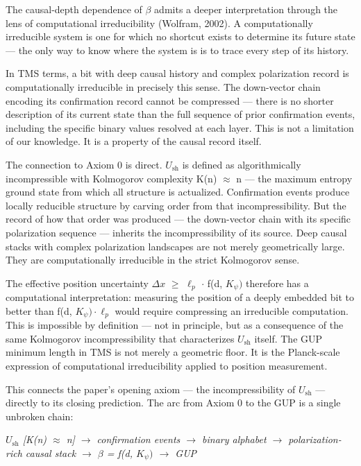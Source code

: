 \documentclass[11pt,oneside]{report}
\theoremstyle{definition}
\theoremstyle{remark}
\begin{document}
The causal-depth dependence of \ensuremath{\beta} admits a deeper interpretation through
the lens of computational irreducibility (Wolfram, 2002). A
computationally irreducible system is one for which no shortcut exists
to determine its future state --- the only way to know where the system
is is to trace every step of its history.

In TMS terms, a bit with deep causal history and complex polarization
record is computationally irreducible in precisely this sense. The
down-vector chain encoding its confirmation record cannot be compressed
--- there is no shorter description of its current state than the full
sequence of prior confirmation events, including the specific binary
values resolved at each layer. This is not a limitation of our
knowledge. It is a property of the causal record itself.

The connection to Axiom 0 is direct. \ensuremath{U_{\mathrm{sh}}} is defined as algorithmically
incompressible with Kolmogorov complexity K(n) \ensuremath{\approx} n --- the maximum
entropy ground state from which all structure is actualized.
Confirmation events produce locally reducible structure by carving order
from that incompressibility. But the record of how that order was
produced --- the down-vector chain with its specific polarization
sequence --- inherits the incompressibility of its source. Deep causal
stacks with complex polarization landscapes are not merely geometrically
large. They are computationally irreducible in the strict Kolmogorov
sense.

The effective position uncertainty \ensuremath{\Delta x} \ensuremath{\geq} \ensuremath{\ell_{p}} \ensuremath{\cdot} f(d, \ensuremath{K_{\psi})} therefore has a
computational interpretation: measuring the position of a deeply
embedded bit to better than f(d, \ensuremath{K_{\psi})\cdot \ell_{p}} would require compressing an
irreducible computation. This is impossible by definition --- not in
principle, but as a consequence of the same Kolmogorov incompressibility
that characterizes \ensuremath{U_{\mathrm{sh}}} itself. The GUP minimum length in TMS is not
merely a geometric floor. It is the Planck-scale expression of
computational irreducibility applied to position measurement.

This connects the paper's opening axiom --- the incompressibility of \ensuremath{U_{\mathrm{sh}}}
--- directly to its closing prediction. The arc from Axiom 0 to the GUP
is a single unbroken chain:

\emph{\ensuremath{U_{\mathrm{sh}}} [K(n) \ensuremath{\approx} n] \ensuremath{\to} confirmation events \ensuremath{\to} binary alphabet \ensuremath{\to}
polarization-rich causal stack \ensuremath{\to} \ensuremath{\beta} = f(d, \ensuremath{K_{\psi})} \ensuremath{\to} GUP}
\end{document}
